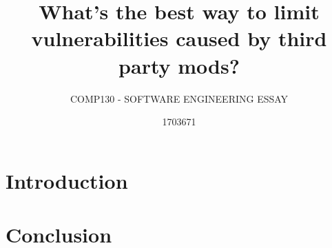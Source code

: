 \documentclass{scrartcl}
\title{What's the best way to limit vulnerabilities caused by third party mods?}
\subtitle{COMP130 - SOFTWARE ENGINEERING ESSAY}
\author{1703671}
\begin{document}
\maketitle

\section{Introduction}
\cite{WinNT}


\section{Conclusion}

\abstract{}



\end{document}
